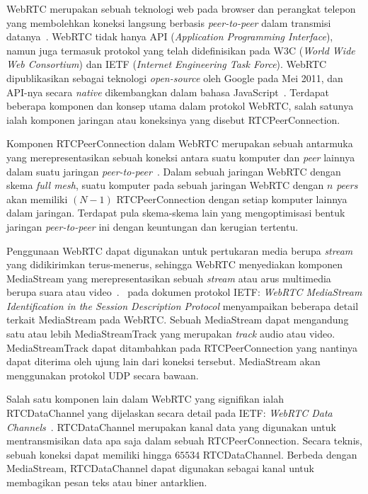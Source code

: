 WebRTC merupakan sebuah teknologi web pada browser dan perangkat telepon yang membolehkan koneksi langsung berbasis \textit{peer-to-peer} dalam transmisi datanya~\citep{rfc8835}. WebRTC tidak hanya API (\textit{Application Programming Interface}), namun juga termasuk protokol yang telah didefinisikan pada W3C (\textit{World Wide Web Consortium}) dan IETF (\textit{Internet Engineering Task Force}). WebRTC dipublikasikan sebagai teknologi \textit{open-source} oleh Google pada Mei 2011, dan API-nya secara \textit{native} dikembangkan dalam bahasa JavaScript~\citep{dutton2012getting}. Terdapat beberapa komponen dan konsep utama dalam protokol WebRTC, salah satunya ialah komponen jaringan atau koneksinya yang disebut RTCPeerConnection.

Komponen RTCPeerConnection dalam WebRTC merupakan sebuah antarmuka yang merepresentasikan sebuah koneksi antara suatu komputer dan \textit{peer} lainnya dalam suatu jaringan \textit{peer-to-peer}~\citep{rfc8835, rfc8834, jennings2013real}. Dalam sebuah jaringan WebRTC dengan skema \textit{full mesh}, suatu komputer pada sebuah jaringan WebRTC dengan $n$ \textit{peers} akan memiliki $(N-1)$ RTCPeerConnection dengan setiap komputer lainnya dalam jaringan. Terdapat pula skema-skema lain yang mengoptimisasi bentuk jaringan \textit{peer-to-peer} ini dengan keuntungan dan kerugian tertentu.

Penggunaan WebRTC dapat digunakan untuk pertukaran media berupa \textit{stream} yang didikirimkan terus-menerus, sehingga WebRTC menyediakan komponen MediaStream yang merepresentasikan sebuah \textit{stream} atau arus multimedia berupa suara atau video~\citep{sredojev2015webrtc, rfc8835}.~\cite{rfc8830} pada dokumen protokol IETF: \textit{WebRTC MediaStream Identification in the Session Description Protocol} menyampaikan beberapa detail terkait MediaStream pada WebRTC. Sebuah MediaStream dapat mengandung satu atau lebih MediaStreamTrack yang merupakan \textit{track} audio atau video. MediaStreamTrack dapat ditambahkan pada RTCPeerConnection yang nantinya dapat diterima oleh ujung lain dari koneksi tersebut. MediaStream akan menggunakan protokol UDP secara bawaan.

Salah satu komponen lain dalam WebRTC yang signifikan ialah RTCDataChannel yang dijelaskan secara detail pada IETF: \textit{WebRTC Data Channels}~\citep{rfc8831}. RTCDataChannel merupakan kanal data yang digunakan untuk mentransmisikan data apa saja dalam sebuah RTCPeerConnection. Secara teknis, sebuah koneksi dapat memiliki hingga $65534$ RTCDataChannel. Berbeda dengan MediaStream, RTCDataChannel dapat digunakan sebagai kanal untuk membagikan pesan teks atau biner antarklien.

